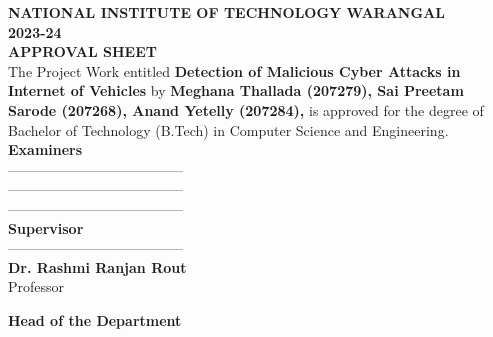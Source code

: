 \begin{titlepage}
   \begin{center}
       \textbf{\Large{NATIONAL INSTITUTE OF TECHNOLOGY WARANGAL}} \\
       \textbf{\Large{2023-24}} \\
       \vspace{0.8cm}
       \textbf{\Large{APPROVAL SHEET}}\\
       \vspace{1.3cm}
        The Project Work entitled \textbf{Detection of Malicious Cyber Attacks in Internet of Vehicles} by \textbf
        {Meghana Thallada (207279), 
        Sai Preetam Sarode (207268),\linebreak
        Anand Yetelly (207284),
        } is approved for
        the degree of Bachelor of Technology (B.Tech) in Computer Science and Engineering.\\
       \vspace{0.7cm}
        \textbf{Examiners}\\
        \vspace{1cm}
        --------------------------------------\\ 
         \vspace{1em}
        --------------------------------------\\
        \vspace{1em}
        --------------------------------------\\
        
        

       \vspace{1cm}
       \textbf{Supervisor}\\
       \vspace{0.8cm}
        --------------------------------------\\ 
       \vspace{0.4cm}
       \textbf{Dr. Rashmi Ranjan Rout}\\
       Professor
       \vspace{0.4cm}
       \vspace{0.8cm}
       
      \textbf{Head of the Department}\\
      

\end{center}
\end{titlepage}
